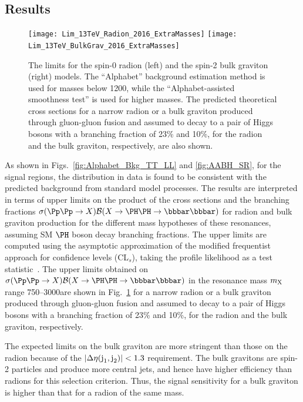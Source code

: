 \subsection{Results\label{sec:Results}}

\begin{figure}[h]
  \centering
  \texttt{[image: Lim\_13TeV\_Radion\_2016\_ExtraMasses]}
  \texttt{[image: Lim\_13TeV\_BulkGrav\_2016\_ExtraMasses]}
  \caption{The limits for the spin-0 radion (left) and the
    spin-2 bulk graviton (right) models. The ``Alphabet'' background
    estimation method is used for masses below 1200\GeV, while the
    ``Alphabet-assisted smoothness test'' is used for higher masses. The
    predicted theoretical cross sections for a narrow radion or a bulk
    graviton produced through gluon-gluon fusion and assumed to decay
    to a pair of Higgs bosons with a branching fraction of 23\% and
    10\%, for the radion and the bulk graviton, respectively, are also
    shown.}
  \label{fig:lim_rad_grav_comb}
\end{figure}

As shown in Figs.~\ref{fig:Alphabet_Bkg_TT_LL} %
and \ref{fig:AABH_SR}, for the signal regions, the \mjjs distribution in data is found to be
consistent with the predicted background from standard model
processes. The results are interpreted in terms of upper limits on the
product of the cross sections and the branching fractions 
$\sigma(\Pp\Pp \to X) \mathcal{B}(X \to \PH\PH \to \bbbar \bbbar)$
for radion and bulk graviton production for the
different mass hypotheses of these resonances, assuming SM $\PH$
boson decay branching fractions. The upper limits are computed using
the asymptotic approximation of the modified frequentist approach for
confidence levels (CL$_s$), taking the profile likelihood as a test
statistic~\cite{CLS1,CLS2}. The upper limits obtained on $\sigma(\Pp\Pp \to X) \mathcal{B}(X \to \PH\PH \to \bbbar \bbbar)$ in the resonance mass $m_{\text{X}}$ range 750--3000\GeV are shown in
Fig.~\ref{fig:lim_rad_grav_comb} for a narrow radion or a bulk
graviton produced through gluon-gluon fusion and assumed to decay to a
pair of Higgs bosons with a branching fraction of 23\% and 10\%, for
the radion and the bulk graviton, respectively.

The expected limits on the bulk graviton are more stringent than those
on the radion because of the $|\Delta\eta(\text{j}_{1}, \text{j}_{2})| < 1.3$ requirement. The bulk
gravitons are spin-2 particles and produce more central jets, and
hence have higher efficiency than radions for this selection
criterion. Thus, the signal sensitivity for a bulk graviton is higher
than that for a radion of the same mass. 

